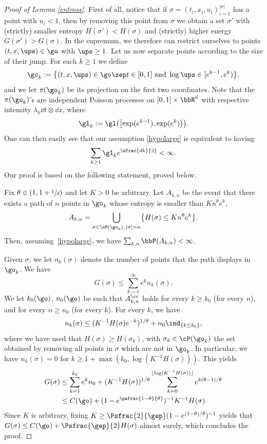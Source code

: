 \begin{proof}[Proof of Lemma \ref{entross}]
First of all, notice that if $\sigma = (t_i,x_i,u_i)_{i=1}^{|\sigma|}$
has a point with $u_i < 1$,
then by removing this point from $\sigma$
we obtain a set $\sigma'$ with (strictly) smaller entropy $H(\sigma') < H(\sigma)$ and (strictly) higher energy $G(\sigma') > G(\sigma)$.
In the supremum, we therefore can restrict ourselves to points
$(t,x,\ups) \in \go$ with $\ups\geq 1$.
Let us now separate points according to the size of their jump.
For each $k\ge 1$ we define
\[
\go_k := \bigl\{ (t,x, \ups)\in \go \sep t\in[0,1] \text{ and } \log \ups \in [ e^{k-1}, e^{k}) \bigr\},
\]
and we let $\pi(\go_k)$ be its projection on the first two coordinates.
Note that the $\pi(\go_k)$'s are independent Poisson processes on $[0,1]\times \bbR^d$ with respective intensity $\lambda_k \dd t\otimes \dd x$, where
\[
\gl_k:= \gl\bigl(\bigl[\exp(e^{k-1}), \exp(e^k) \bigr) \bigr).
\]
One can then easily see that our assumption \eqref{hypolarge}
is equivalent to
having
\begin{equation}
\label{eq:condition}
\sum_{k\ge 1} \gl_k e^{ \sfrac{dk}{2}}<\infty.
\end{equation}
Our proof is based on the following statement, proved below.
\begin{lemma}\label{bcantelli}
Fix $\theta\in \left(1, 1+\sfrac{1}{d}\right)$ and let $K>0$ be arbitrary.
Let $A_{k,n}$ be the event that there exists a path of $n$ points in $\go_k$ whose entropy is smaller than $K n^{\theta} e^{k}$,
\ie 
\[
A_{k,n} = \bigcup_{ \sigma \in \cP(\go_k),\, |\sigma|=n } \bigl\{ H(\sigma) \leq K n^{\theta} e^k \bigr\}.
\]
Then, assuming~\eqref{hypolarge}, we have $\sum_{k,n} \bbP(A_{k,n})<\infty$.
\end{lemma}
 Given $\sigma$, we let $n_k(\sigma)$ denote the number of points that the path displays in~$\go_k$.
We have
\begin{equation}
G(\sigma)\le \sum_{k=1}^{\infty} e^{k} n_k(\sigma).
\end{equation}
We let $k_0(\go)$, $n_0(\go)$ be such that $A_{k,n}^{\cc}$ holds for every $k\ge k_0$ (for every $n$), and for every $n\ge n_0$ (for every $k$).
For every $k$, we have
\begin{equation}
n_k(\sigma)\le (K^{-1} H(\sigma)e^{-k})^{ 1/\theta} +n_0\ind_{\{k\le k_0\}},
\end{equation}
where we have used that $H(\sigma) \geq H(\sigma_k)$, with $\sigma_k \in \cP(\go_k)$ the set obtained by removing all points in $\sigma$ which are not in $\go_k$.
In particular, we have $n_k(\sigma)=0$ for $k\ge 1+ \max(k_0, \log (K^{-1} H(\sigma)))$.
This yields
\begin{align*}
G(\sigma) &\le \sum_{k=1}^{k_0} e^k n_0
+ (K^{-1} H(\sigma))^{1/\theta} \sum_{k=0}^{\lfloor \log (K^{-1}H(\sigma)) \rfloor}
e^{k(\theta-1) /\theta} \\
& \le C(\go)+ (1-e^{\psfrac{1-\theta}{\theta}})^{-1} K^{-1} H(\sigma).
\end{align*}
Since $K$ is arbitrary, fixing $K \geq \Psfrac{2}{\gep} (1-e^{(1-\theta)/\theta})^{-1}$ yields that
$G(\sigma) \leq C(\go) + \Psfrac{\gep}{2} H(\sigma)$ almost surely, which concludes the proof.
\end{proof}

